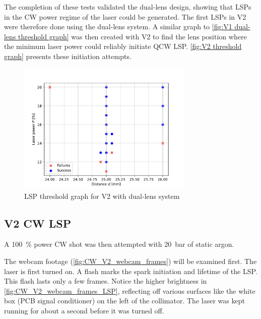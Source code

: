             The completion of these tests validated the dual-lens design, showing that LSPs in the CW power regime of the laser could be generated. The first LSPs in V2 were therefore done using the dual-lens system. A similar graph to \autoref{fig:V1 dual-lens threshold graph} was then created with V2 to find the lens position where the minimum laser power could reliably initiate QCW LSP. \autoref{fig:V2 threshold graph} presents these initiation attempts.
            \begin{figure}[!ht]
                \centering
                \includegraphics[width=0.75\textwidth]{assets/4 experiments/V2_focus_threshold.pdf}
                \caption{LSP threshold graph for V2 with dual-lens system}
                \label{fig:V2 threshold graph}
            \end{figure}

        \subsection{V2 CW LSP}

            A \qty{100}{\%} power CW shot was then attempted with \qty{20}{bar} of static argon. 

            

            The webcam footage (\autoref{fig:CW_V2_webcam_frames}) will be examined first. The laser is first turned on. A flash marks the spark initiation and lifetime of the LSP. This flash lasts only a few frames. Notice the higher brightness in \autoref{fig:CW_V2_webcam_frames_LSP}, reflecting off various surfaces like the white box (PCB signal conditioner) on the left of the collimator. The laser was kept running for about a second before it was turned off.


